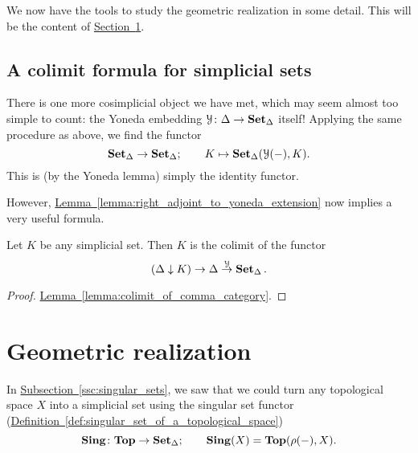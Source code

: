 \documentclass[main.tex]{subfiles}
\begin{document}
We now have the tools to study the geometric realization in some detail. This will be the content of \hyperref[sec:geometric_realization]{Section~\ref*{sec:geometric_realization}}.

\subsection{A colimit formula for simplicial sets}
\label{ssc:a_colimit_formula_for_simplicial_sets}

There is one more cosimplicial object we have met, which may seem almost too simple to count: the Yoneda embedding $\mathcal{Y}\colon \Delta \to \operatorname{\mathbf{Set}_{\Delta}}$ itself! Applying the same procedure as above, we find the functor
\begin{equation*}
  \operatorname{\mathbf{Set}_{\Delta}} \to \operatorname{\mathbf{Set}_{\Delta}};\qquad K \mapsto \operatorname{\mathbf{Set}_{\Delta}}(\mathcal{Y}(-), K).
\end{equation*}
This is (by the Yoneda lemma) simply the identity functor.

However, \hyperref[lemma:right_adjoint_to_yoneda_extension]{Lemma~\ref*{lemma:right_adjoint_to_yoneda_extension}} now implies a very useful formula.

\begin{proposition}
  \label{prop:colimit_formula_for_simplicial_set}
  Let $K$ be any simplicial set. Then $K$ is the colimit of the functor
  \begin{equation*}
    (\Delta \downarrow K) \to \Delta \overset{\mathcal{Y}}{\to} \operatorname{\mathbf{Set}_{\Delta}}.
  \end{equation*}
\end{proposition}
\begin{proof}
  \hyperref[lemma:colimit_of_comma_category]{Lemma~\ref*{lemma:colimit_of_comma_category}}.
\end{proof}

\section{Geometric realization}
\label{sec:geometric_realization}

In \hyperref[ssc:singular_sets]{Subsection~\ref*{ssc:singular_sets}}, we saw that we could turn any topological space $X$ into a simplicial set using the singular set functor (\hyperref[def:singular_set_of_a_topological_space]{Definition~\ref*{def:singular_set_of_a_topological_space}})
\begin{equation*}
  \mathbf{Sing}\colon \mathbf{Top} \to \operatorname{\mathbf{Set}_{\Delta}};\qquad \mathbf{Sing}(X) = \mathbf{Top}(\rho(-), X).
\end{equation*}
\end{document}
